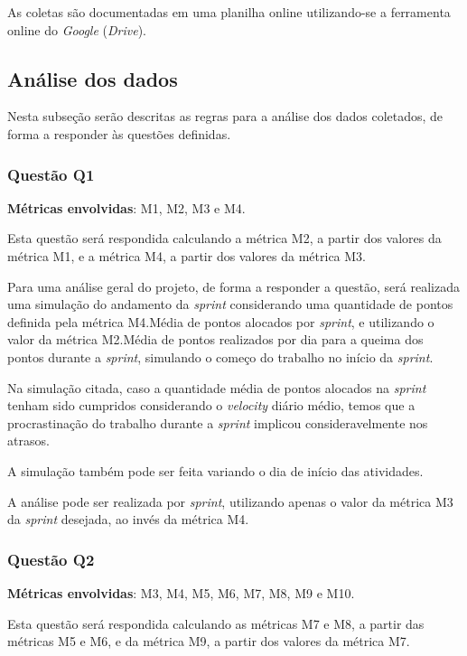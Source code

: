       As coletas são documentadas em uma planilha online utilizando-se a ferramenta online do \textit{Google} (\textit{Drive}).

      \subsection{Análise dos dados}

      	Nesta subseção serão descritas as regras para a análise dos dados coletados, de forma a responder às questões definidas.

      	\subsubsection{Questão Q1}

      		\textbf{Métricas envolvidas}: M1, M2, M3 e M4.

      		Esta questão será respondida calculando a métrica M2, a partir dos valores da métrica M1, e a métrica M4, a partir dos valores
      		da métrica M3.

      		Para uma análise geral do projeto, de forma a responder a questão, será realizada uma simulação do andamento da \textit{sprint} considerando uma quantidade de
      		pontos definida pela métrica M4.Média de pontos alocados por \textit{sprint}, e utilizando o valor da métrica M2.Média de pontos realizados por dia para a queima dos pontos durante a \textit{sprint}, simulando o começo do trabalho no início da \textit{sprint}.

      		Na simulação citada, caso a quantidade média de pontos alocados na \textit{sprint} tenham sido cumpridos considerando
      		o \textit{velocity} diário médio, temos que a procrastinação do trabalho durante a \textit{sprint} implicou
      		consideravelmente nos atrasos.

      		A simulação também pode ser feita variando o dia de início das atividades.

      		A análise pode ser realizada por \textit{sprint}, utilizando apenas o valor da métrica M3 da \textit{sprint} desejada, ao invés da métrica M4.

		\subsubsection{Questão Q2}

			\textbf{Métricas envolvidas}: M3, M4, M5, M6, M7, M8, M9 e M10.

			Esta questão será respondida calculando as métricas M7 e M8, a partir das métricas M5 e M6, e da métrica M9, a partir dos
			valores da métrica M7.

